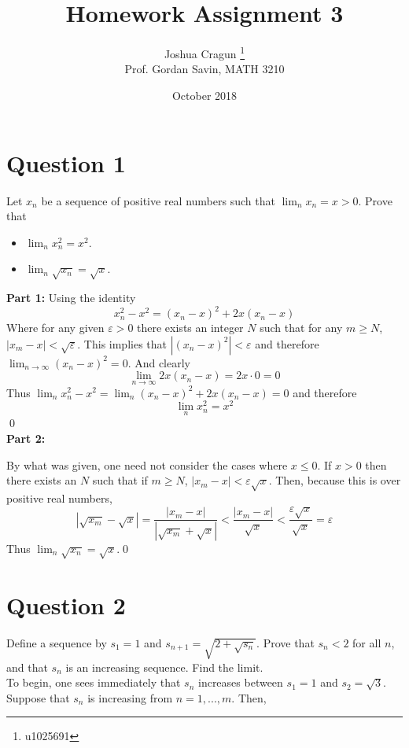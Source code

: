 \documentclass[12pt, letterpaper]{article}
\title{Homework Assignment 3}
\author{Joshua Cragun \thanks{u1025691} \\ Prof. Gordan Savin, MATH 3210}
\date{October 2018}
\begin{document}
\begin{titlepage}
\maketitle
\end{titlepage}

\pagebreak

\section*{Question 1}
Let $x_n$ be a sequence of positive real numbers such that $\lim_n x_n =x>0$. Prove that
\begin{itemize}
\item
$\lim_n x_n^2= x^2$.
\item
$\lim_n \sqrt{x_n}= \sqrt{x}$.
\end{itemize}

\noindent\textbf{Part 1:} Using the identity
$$ x_n^2 - x^2 = (x_n - x)^2 + 2x(x_n - x) $$
Where for any given $\varepsilon > 0$ there exists an integer $N$ such that for any $m \geq N$, $|x_m - x| < \sqrt{\varepsilon}$.
This implies that $|(x_n - x)^2| < \varepsilon$ and therefore $\lim_{n\to\infty} (x_n - x)^2 = 0$. And clearly
$$\lim_{n\to\infty} 2x(x_n - x) = 2x \cdot 0 = 0$$
Thus $\lim_n x_n^2 - x^2 = \lim_n (x_n - x)^2 + 2x(x_n - x) = 0$ and therefore
$$ \lim_n x_n^2 = x^2 $$
\qed
\\
\noindent\textbf{Part 2:}

\noindent By what was given, one need not consider the cases where $x \leq 0$. If $x > 0$ then there exists an $N$ such that if $m \geq N$, $|x_m - x| < \varepsilon\sqrt{x}$. Then, because this is over positive real numbers,
$$ |\sqrt{x_m} - \sqrt{x}| = \frac{|x_m - x|}{|\sqrt{x_m} + \sqrt{x}|} < \frac{|x_m - x|}{\sqrt{x}} < \frac{\varepsilon\sqrt{x}}{\sqrt{x}} = \varepsilon $$
Thus $\lim_n \sqrt{x_n}= \sqrt{x}$.\qed

\pagebreak

\section*{Question 2}
Define a sequence by $s_1=1$ and $s_{n+1} = \sqrt{2+\sqrt{s_n}}$. Prove that $s_n <2$ for all $n$, and that $s_n$ is an increasing sequence. Find the limit.\\

\noindent To begin, one sees immediately that $s_n$ increases between $s_1 = 1$ and $s_2 = \sqrt{3}$. Suppose that $s_n$ is increasing from $n = 1, ..., m$. Then,
\end{document}

